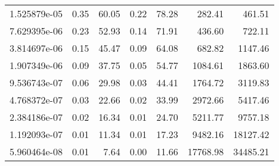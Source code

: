 \begin{tabular}{lrrrrrr}
1.525879e-05 &        0.35 &         60.05 &           0.22 &        78.28 &           282.41 &          461.51 \\
7.629395e-06 &        0.23 &         52.93 &           0.14 &        71.91 &           436.60 &          722.11 \\
3.814697e-06 &        0.15 &         45.47 &           0.09 &        64.08 &           682.82 &         1147.46 \\
1.907349e-06 &        0.09 &         37.75 &           0.05 &        54.77 &          1084.61 &         1863.60 \\
9.536743e-07 &        0.06 &         29.98 &           0.03 &        44.41 &          1764.72 &         3119.83 \\
4.768372e-07 &        0.03 &         22.66 &           0.02 &        33.99 &          2972.66 &         5417.46 \\
2.384186e-07 &        0.02 &         16.34 &           0.01 &        24.70 &          5211.77 &         9757.18 \\
1.192093e-07 &        0.01 &         11.34 &           0.01 &        17.23 &          9482.16 &        18127.42 \\
5.960464e-08 &        0.01 &          7.64 &           0.00 &        11.66 &         17768.98 &        34485.21 \\
\bottomrule
\end{tabular}
